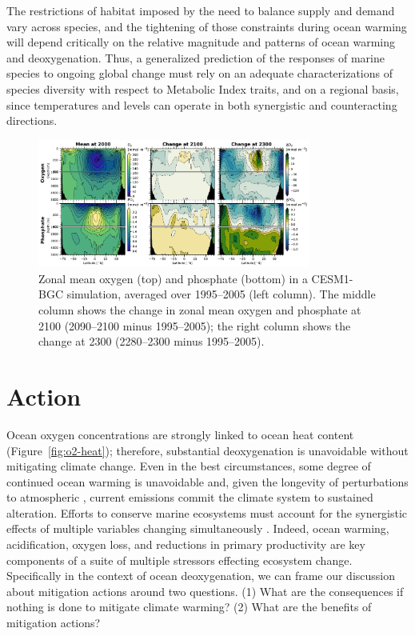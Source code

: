 \documentclass[draft,linenumbers]{report_chapter}
\begin{document}
The restrictions of habitat imposed by the need to balance  supply and demand vary across species, and the tightening of those constraints during ocean warming will depend critically on the relative magnitude and patterns of ocean warming and deoxygenation.
Thus, a generalized prediction of the responses of marine species to ongoing global change must rely on an adequate characterizations of species diversity with respect to Metabolic Index traits, and on a regional basis, since temperatures and  levels can operate in both synergistic and counteracting directions.


\begin{figure}
\centering
\includegraphics[width=0.8\textwidth]{global-zonal-mean-2300.pdf}
\caption{Zonal mean oxygen (top) and phosphate (bottom) in a CESM1-BGC simulation, averaged over 1995--2005 (left column).
The middle column shows the change in zonal mean oxygen and phosphate at 2100 (2090--2100 minus 1995--2005); the right column shows the change at 2300 (2280--2300 minus 1995--2005).}
\label{fig:2300}
\end{figure}

\section{Action}

Ocean oxygen concentrations are strongly linked to ocean heat content (Figure~\ref{fig:o2-heat}); therefore, substantial deoxygenation is unavoidable without mitigating climate change.
Even in the best circumstances, some degree of continued ocean warming is unavoidable and, given the longevity of perturbations to atmospheric  \citep{Archer-Kheshgi-etal-1997}, current emissions commit the climate system to sustained alteration.
Efforts to conserve marine ecosystems must account for the synergistic effects of multiple variables changing simultaneously \citep[e.g.,][]{Brewer-Peltzer-2009,Portner-2010,Deutsch-Ferrel-etal-2015,Boyd-Lennartz-etal-2014}.
Indeed, ocean warming, acidification, oxygen loss, and reductions in primary productivity are key components of a suite of multiple stressors effecting ecosystem change.
Specifically in the context of ocean deoxygenation, we can frame our discussion about mitigation actions around two questions.
(1) What are the consequences if nothing is done to mitigate climate warming?
(2) What are the benefits of mitigation actions?
\end{document}
